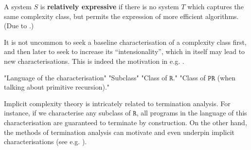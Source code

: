 \begin{notion} A system $S$ is \textbf{relatively expressive} if there is no
system $T$ which captures the same complexity class, but permits the expression
of more efficient algorithms. (Due to \cite{jones-2001}.) \end{notion}

It is not uncommon to seek a baseline characterisation of a complexity class
first, and then later to seek to increase its ``intensionality'', which in
itself may lead to new characterisations. This is indeed the motivation in e.g.
\cite{hofmann-1999, marion-moyen-2000, niggl-2005, niggl-wunderlich-2006,
marion-pechoux-2008, jones-kristiansen-2009}.

"Language of the characterisation"
"Subclass"
"Class of $\mathtt{R}$."
"Class of $\mathtt{PR}$ (when talking about primitive recursion)."

Implicit complexity theory is intricately related to termination analysis. For
instance, if we characterise any subclass of $\mathtt{R}$, all programs in the
language of this characterisation are guaranteed to terminate by construction.
On the other hand, the methods of termination analysis can motivate and even
underpin implicit characterisations (see e.g.  \cite{marion-2003}).







